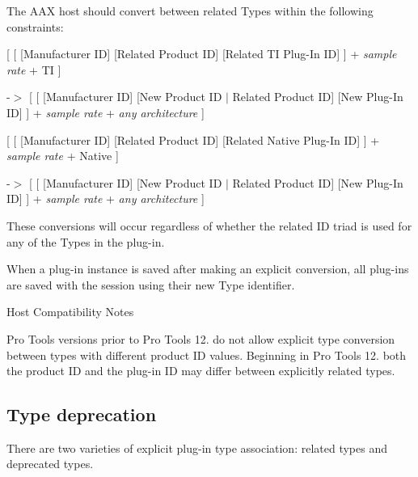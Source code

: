 The A\+AX host should convert between related Types within the following constraints\+: 
\begin{DoxyItemize}
\item \mbox{[} \mbox{[} \mbox{[}Manufacturer ID\mbox{]} \mbox{[}Related Product ID\mbox{]} \mbox{[}Related TI Plug-\/\+In ID\mbox{]} \mbox{]} + {\itshape sample rate} + TI \mbox{]} 
\begin{DoxyItemize}
\item -\/$>$ \mbox{[} \mbox{[} \mbox{[}Manufacturer ID\mbox{]} \mbox{[}New Product ID $\vert$ Related Product ID\mbox{]} \mbox{[}New Plug-\/\+In ID\mbox{]} \mbox{]} + {\itshape sample rate} + {\itshape any architecture} \mbox{]}  
\end{DoxyItemize}
\item \mbox{[} \mbox{[} \mbox{[}Manufacturer ID\mbox{]} \mbox{[}Related Product ID\mbox{]} \mbox{[}Related Native Plug-\/\+In ID\mbox{]} \mbox{]} + {\itshape sample rate} + Native \mbox{]} 
\begin{DoxyItemize}
\item -\/$>$ \mbox{[} \mbox{[} \mbox{[}Manufacturer ID\mbox{]} \mbox{[}New Product ID $\vert$ Related Product ID\mbox{]} \mbox{[}New Plug-\/\+In ID\mbox{]} \mbox{]} + {\itshape sample rate} + {\itshape any architecture} \mbox{]}  
\end{DoxyItemize}
\end{DoxyItemize}

These conversions will occur regardless of whether the related ID triad is used for any of the Types in the plug-\/in.

When a plug-\/in instance is saved after making an explicit conversion, all plug-\/ins are saved with the session using their new Type identifier.

\begin{DoxyRefDesc}{Host Compatibility Notes}
\item[\mbox{\hyperlink{a00786__compatibility_notes000009}{Host Compatibility Notes}}]Pro Tools versions prior to Pro Tools 12. do not allow explicit type conversion between types with different product ID values. Beginning in Pro Tools 12. both the product ID and the plug-\/in ID may differ between explicitly related types.\end{DoxyRefDesc}
\hypertarget{a00826_advancedTopics_relatedTypes_deprecation}{}\subsection{Type deprecation}\label{a00826_advancedTopics_relatedTypes_deprecation}
There are two varieties of explicit plug-\/in type association\+: related types and deprecated types.

